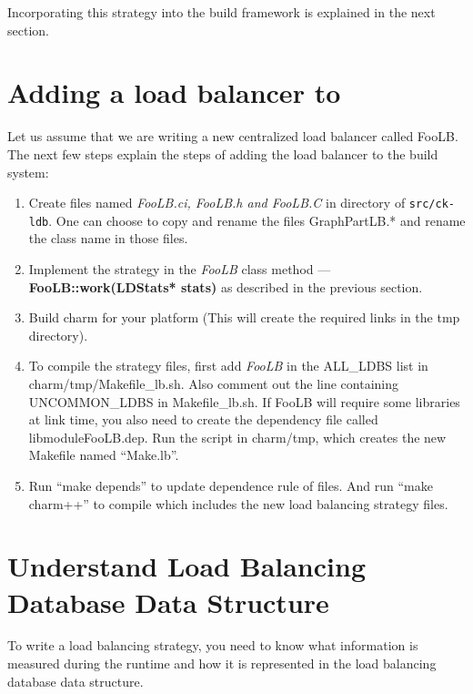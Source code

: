 Incorporating this strategy into the \charmpp{} build framework is explained in
the next section.

\section{Adding a load balancer to \charmpp{}}

Let us assume that we are writing a new centralized load balancer called FooLB.
The next few steps explain the steps of adding the load balancer to the \charmpp{}
build system:

\begin{enumerate}
\item Create files named {\em FooLB.ci, FooLB.h and FooLB.C} in directory of {\tt src/ck-ldb}.
One can choose to copy and rename the files GraphPartLB.* and rename the class name in those
files.

\item Implement the strategy in the {\em FooLB} class method --- {\bf
FooLB::work(LDStats* stats)} as described in the previous section.

\item Build charm for your platform (This will create the required links in the
tmp directory).

\item To compile the strategy files, first add {\em FooLB} in the ALL\_LDBS
list in charm/tmp/Makefile\_lb.sh. Also comment out the line containing
UNCOMMON\_LDBS in Makefile\_lb.sh.  If FooLB will require some libraries at
link time, you also need to create the dependency file called
libmoduleFooLB.dep. Run the script in charm/tmp, which creates the new Makefile
named ``Make.lb''.

\item Run ``make depends'' to update dependence rule of \charmpp{} files.  And run
``make charm++'' to compile \charmpp{} which includes the new load balancing
strategy files.
\end{enumerate}


\section{Understand Load Balancing Database Data Structure}
\label{lbdatabase}

To write a load balancing strategy, you need to know 
what information is measured during the runtime and how it is represented in
the load balancing database data structure.

